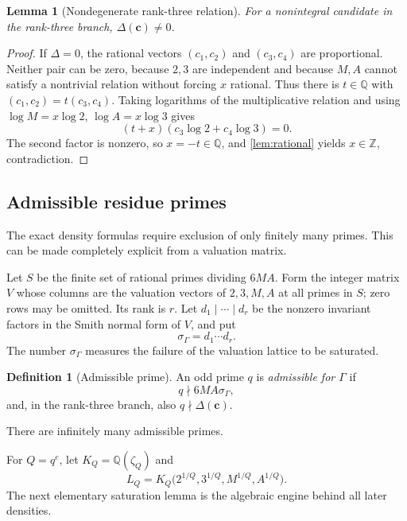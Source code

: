 \documentclass[11pt]{article}
\newtheorem{lemma}[theorem]{Lemma}
\theoremstyle{definition}
\newtheorem{definition}[theorem]{Definition}
\theoremstyle{remark}
\newcommand{\Q}{\mathbb{Q}}
\newcommand{\Z}{\mathbb{Z}}
\begin{document}
\begin{lemma}[Nondegenerate rank-three relation]\label{lem:delta}
For a nonintegral candidate in the rank-three branch,
$\Delta(\bm c)\ne0$.
\end{lemma}
\begin{proof}
If $\Delta=0$, the rational vectors $(c_1,c_2)$ and $(c_3,c_4)$ are proportional.
Neither pair can be zero, because $2,3$ are independent and because $M,A$ cannot satisfy a
nontrivial relation without forcing $x$ rational.  Thus there is $t\in\Q$ with
$(c_1,c_2)=t(c_3,c_4)$.  Taking logarithms of the multiplicative relation and using
$\log M=x\log2$, $\log A=x\log3$ gives
\[
  (t+x)(c_3\log2+c_4\log3)=0.
\]
The second factor is nonzero, so $x=-t\in\Q$, and \cref{lem:rational} yields
$x\in\Z$, contradiction.
\end{proof}

\subsection{Admissible residue primes}

The exact density formulas require exclusion of only finitely many primes.  This can be made
completely explicit from a valuation matrix.

Let $S$ be the finite set of rational primes dividing $6MA$.  Form the integer matrix $V$ whose
columns are the valuation vectors of $2,3,M,A$ at all primes in $S$; zero rows may be omitted.
Its rank is $r$.  Let $d_1\mid\cdots\mid d_r$ be the nonzero invariant factors in the Smith
normal form of $V$, and put
\[
       \sigma_\Gamma=d_1\cdots d_r.
\]
The number $\sigma_\Gamma$ measures the failure of the valuation lattice to be saturated.

\begin{definition}[Admissible prime]\label{def:admissible}
An odd prime $q$ is \emph{admissible for $\Gamma$} if
\[
      q\nmid 6MA\sigma_\Gamma,
\]
and, in the rank-three branch, also $q\nmid\Delta(\bm c)$.
\end{definition}
There are infinitely many admissible primes.

For $Q=q^e$, let $K_Q=\Q(\zeta_Q)$ and
\[
 L_Q=K_Q\bigl(2^{1/Q},3^{1/Q},M^{1/Q},A^{1/Q}\bigr).
\]
The next elementary saturation lemma is the algebraic engine behind all later densities.
\end{document}
